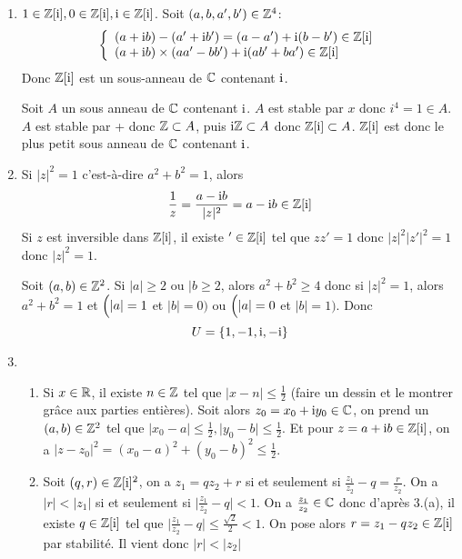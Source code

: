 \begin{solution}
	\phantom{}
	\begin{enumerate}
		\item $1\in\mathbb{Z}[\mathrm{i}],0\in\mathbb{Z}[\mathrm{i}],\mathrm{i}\in\mathbb{Z}[\mathrm{i}]$. Soit $(a,b,a',b')\in\mathbb{Z}^{4}$:
		$$
		\left\{
			\begin{array}[]{l}
				(a+\i b)-(a'+\i b')=(a-a')+\i(b-b')\in\Z[\i]\\
				(a+\i b)\times (aa'-bb')+\i(ab'+ba')\in\Z[\i]
			\end{array}
		\right.
		$$
		Donc $\mathbb{Z}[\mathrm{i}]$ est un sous-anneau de $\mathbb{C}$ contenant $\mathrm{i}$.

		Soit $A$ un sous anneau de $\mathbb{C}$ contenant $\mathrm{i}$. $A$ est stable par $x$ donc $i^{4}=1\in A$. $A$ est stable par + donc $\mathbb{Z}\subset A$, puis $\mathrm{i}\mathbb{Z}\subset A$ donc $\mathbb{Z}[\mathrm{i}]\subset A$. $\mathbb{Z}[\mathrm{i}]$ est donc le plus petit sous anneau de $\mathbb{C}$ contenant $\mathrm{i}$.

		\item Si $\vert z\vert^{2}=1$ c'est-à-dire $a^{2}+b^{2}=1$, alors 
		$$\frac{1}{z}=\frac{a-\mathrm{i} b}{\vert z\vert^{2}}=a-\mathrm{i} b\in\mathbb{Z}[\mathrm{i}]$$
		Si $z$ est inversible dans $\mathbb{Z}[\mathrm{i}]$, il existe $'\in\mathbb{Z}[\mathrm{i}]$ tel que $zz'=1$ donc $\vert z\vert^{2}\vert z'\vert^{2}=1$ donc $\vert z\vert^{2}=1$.

		Soit $(a,b)\in\mathbb{Z}^{2}$. Si $\vert a\vert\geqslant2$ ou $\vert b\geqslant2$, alors $a^{2}+b^{2}\geqslant4$ donc si $\vert z\vert^{2}=1$, alors $a^{2}+b^{2}=1$ et $\Bigl(\vert a\vert=1$ et $\vert b\vert=0\Bigr)$ ou $\Bigl(\vert a\vert=0$ et $\vert b\vert=1\Bigr)$. Donc 
		$$U=\{1,-1,\mathrm{i},-\mathrm{i}\}$$

		\item 
		\begin{enumerate}
			\item Si $x\in\mathbb{R}$, il existe $n\in\mathbb{Z}$ tel que $\vert x-n\vert\leqslant\frac{1}{2}$ (faire un dessin et le montrer grâce aux parties entières). Soit alors $z_{0}=x_{0}+\mathrm{i} y_{0}\in\mathbb{C}$, on prend un $(a,b)\in\mathbb{Z}^{2}$ tel que $\vert x_{0}-a\vert\leqslant\frac{1}{2},\vert y_{0}-b\vert\leqslant\frac{1}{2}$. Et pour $z=a+\mathrm{i} b\in\mathbb{Z}[\mathrm{i}]$, on a $\vert z-z_{0}\vert^{2}=(x_{0}-a)^{2}+(y_{0}-b)^{2}\leqslant\frac{1}{2}$.
			
			\item Soit $(q,r)\in\mathbb{Z}[\mathrm{i}]^{2}$, on a $z_{1}=qz_{2}+r$ si et seulement si $\frac{z_{1}}{z_{2}}-q=\frac{r}{z_{2}}$. On a $\vert r\vert<\vert z_{1}\vert$ si et seulement si $\bigl\vert\frac{z_{1}}{z_{2}}-q\bigr\vert<1$.
			On a $\frac{z_{1}}{z_{2}}\in\mathbb{C}$ donc d'après 3.(a), il existe $q\in\mathbb{Z}[\mathrm{i}]$ tel que $\bigl\lvert \frac{z_{1}}{z_{2}}-q\bigr\rvert\leqslant\frac{\sqrt{2}}{2}<1$. On pose alors $r=z_{1}-qz_{2}\in\mathbb{Z}[\mathrm{i}]$ par stabilité. Il vient donc $\vert r\vert<\vert z_{2}\vert$


\end{enumerate}
\end{enumerate}
\end{solution}
